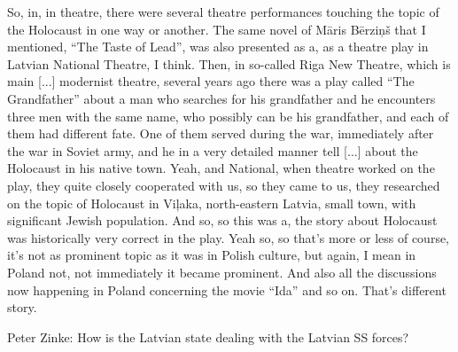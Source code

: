So, in, in theatre, there were several theatre performances touching the topic of the Holocaust in one way or another. The same novel of Māris Bērziņš that I mentioned, “The Taste of Lead”, was also presented as a, as a theatre play in Latvian National Theatre, I think. Then, in so-called Riga New Theatre, which is main [...] modernist theatre, several years ago there was a play called “The Grandfather” about a man who searches for his grandfather and he encounters three men with the same name, who possibly can be his grandfather, and each of them had different fate. One of them served during the war, immediately after the war in Soviet army, and he in a very detailed manner tell [...] about the Holocaust in his native town. Yeah, and National, when theatre worked on the play, they quite closely cooperated with us, so they came to us, they researched on the topic of Holocaust in Viļaka, north-eastern Latvia, small town, with significant Jewish population. And so, so this was a, the story about Holocaust was historically very correct in the play. Yeah so, so that’s more or less of course, it’s not as prominent topic as it was in Polish culture, but again, I mean in Poland not, not immediately it became prominent. And also all the discussions now happening in Poland concerning the movie “Ida” and so on. That’s different story. 

Peter Zinke: How is the Latvian state dealing with the Latvian SS forces? 

